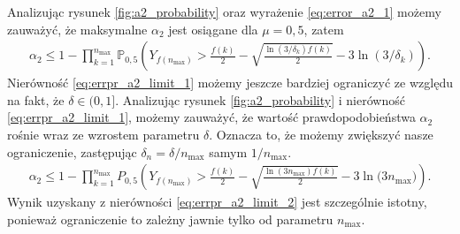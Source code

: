 \documentclass[inzynierska]{pwr_wmat_praca_dyplomowa}
\theoremstyle{plain}
\numberwithin{theorem}{chapter}
\theoremstyle{definition}
\numberwithin{theorem}{chapter}
\newcommand{\probP}{\mathbb{P}}
\newcommand{\nmax}{n_{\text{max}}}
\begin{document}
	Analizując rysunek \ref{fig:a2_probability} oraz wyrażenie \eqref{eq:error_a2_1} możemy zauważyć, że maksymalne $\alpha_2$ jest osiągane dla $\mu = 0,5$, zatem
	\begin{align}
		\label{eq:errpr_a2_limit_1}
		\alpha_2 \le 1 - \prod_{k=1}^{\nmax} \probP_{0,5}\left( Y_{f(\nmax)}  > \frac{f(k)}{2} -  \sqrt{\frac{\ln(3/\delta_k)f(k)}{2}} - 3  \ln{(3 / \delta_k)} \right).
	\end{align}
	Nierówność \eqref{eq:errpr_a2_limit_1} możemy jeszcze bardziej ograniczyć ze względu na fakt, że $\delta\in(0, 1]$. Analizując rysunek \ref{fig:a2_probability} i nierówność \eqref{eq:errpr_a2_limit_1}, możemy zauważyć, że wartość prawdopodobieństwa $\alpha_2$ rośnie wraz ze wzrostem parametru $\delta$. Oznacza to, że możemy zwiększyć nasze ograniczenie, zastępując $\delta_n = \delta/\nmax$ samym $1/\nmax$.
	\begin{align}
		\label{eq:errpr_a2_limit_2}
		\alpha_2 \le 1 - \prod_{k=1}^{\nmax} P_{0,5}\left( Y_{f(\nmax)}  > \frac{f(k)}{2} -  \sqrt{\frac{\ln(3\nmax)f(k)}{2}} - 3  \ln{(3\nmax})  \right).
	\end{align}
	\noindent
	Wynik uzyskany z nierówności \eqref{eq:errpr_a2_limit_2} jest szczególnie istotny, ponieważ ograniczenie to zależny jawnie tylko od parametru $\nmax$.
\end{document}
